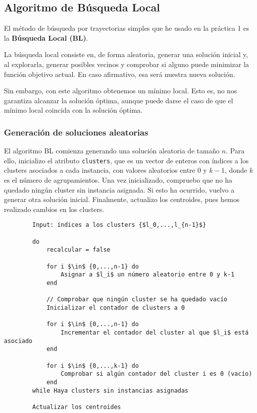 	\subsection{Algoritmo de Búsqueda Local}

	El método de búsqueda por trayectorias simples que he usado en la práctica 1 es la \textbf{Búsqueda Local (BL)}.
	
	La búsqueda local consiste en, de forma aleatoria, generar una solución inicial y, al explorarla, generar posibles 
	vecinos y comprobar si alguno puede minimizar la función objetivo actual. En caso afirmativo, esa será nuestra nueva
	solución.

	Sin embargo, con este algoritmo obtenemos un mínimo local. Esto es, no nos garantiza alcanzar la solución óptima, aunque 
	puede darse el caso de que el mínimo local coincida con la solución óptima.

	\subsubsection{Generación de soluciones aleatorias}
		El algoritmo BL comienza generando una solución aleatoria de tamaño $n$. Para ello, inicializo el atributo \lstinline!clusters!, que 
		es un vector de enteros con índices a los clusters asociados a cada instancia, con valores aleatorios entre $0$ y $k-1$, 
		donde $k$ es el número de agrupamientos. Una vez inicializado, compruebo que no ha quedado ningún cluster sin instancia asignada.
		Si esto ha ocurrido, vuelvo a generar otra solución inicial. Finalmente, actualizo los centroides, pues hemos realizado cambios en los clusters.

		\footnotesize
		\begin{lstlisting}
		Input: índices a los clusters {$l_0,...,l_{n-1}$}

		do 
			recalcular = false
			
			for i $\in$ {0,...,n-1} do 
				Asignar a $l_i$ un número aleatorio entre 0 y k-1
			end
			
			// Comprobar que ningún cluster se ha quedado vacío
			Inicializar el contador de clusters a 0
			
			for i $\in$ {0,...,n-1} do 
				Incrementar el contador del cluster al que $l_i$ está asociado
			end
			
			for i $\in$ {0,...,k-1} do
				Comprobar si algún contador del cluster i es 0 (vacío)
			end
		while Haya clusters sin instancias asignadas
		
		Actualizar los centroides
		\end{lstlisting}
		\normalsize

